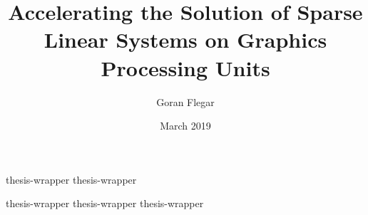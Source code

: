\documentclass[final,a4paper,11pt,twoside]{book}
\newcommand{\advisor}[1]{\def \theadvisor {#1}}
\newcommand{\coadvisor}[1]{\def \thecoadvisor {#1}}
\providecommand{\layout}{}
\begin{document}
\layout{}

\frontmatter
\pagestyle{plain}

\title{Accelerating the Solution of Sparse Linear Systems on Graphics
       Processing Units}
\author{Goran Flegar}
\advisor{Enrique S. Quintana-Ort\'{i}}
\coadvisor{Hartwig Anzt}
\date{March 2019}



\tableofcontents
\cleardoublepage

{thesis-wrapper}
{thesis-wrapper}

\mainmatter
\pagestyle{fancy}

{thesis-wrapper}
{thesis-wrapper}
{thesis-wrapper}

\appendix

\backmatter
\pagestyle{plain}

\listoffigures
{}
\cleardoublepage

\listoftables
{}
\cleardoublepage
\end{document}
